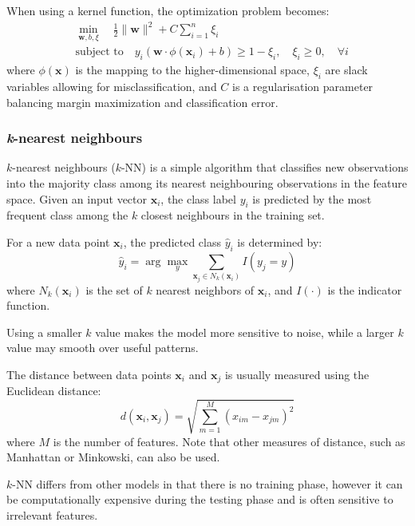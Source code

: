 When using a kernel function, the optimization problem becomes:
\begin{equation}
	\begin{aligned}
		& \min_{\mathbf{w}, b, \xi} \quad \frac{1}{2} \|\mathbf{w}\|^2 + C \sum_{i=1}^{n} \xi_i \\
		& \text{subject to} \quad y_i (\mathbf{w} \cdot \phi(\mathbf{x}_i) + b) \geq 1 - \xi_i, \quad \xi_i \geq 0, \quad \forall i
	\end{aligned}
\end{equation}
where \( \phi(\mathbf{x}) \) is the mapping to the higher-dimensional space, \( \xi_i \) are slack variables allowing for misclassification, and \( C \) is a regularisation parameter balancing margin maximization and classification error.

\subsubsection{\textit{k}-nearest neighbours}

$k$-nearest neighbours ($k$-NN) \cite{knn} is a simple algorithm that classifies new observations into the majority class among its nearest neighbouring observations in the feature space. Given an input vector \( \mathbf{x}_i \), the class label \( y_i \) is predicted by the most frequent class among the \( k \) closest neighbours in the training set.

For a new data point \( \mathbf{x}_i \), the predicted class \( \hat{y}_i \) is determined by:
\begin{equation}
	\hat{y}_i = \arg\max_{y} \sum_{\mathbf{x}_j \in N_k(\mathbf{x}_i)} I(y_j = y)
\end{equation}
where \( N_k(\mathbf{x}_i) \) is the set of \( k \) nearest neighbors of \( \mathbf{x}_i \), and \( I(\cdot) \) is the indicator function.

Using a smaller \( k \) value makes the model more sensitive to noise, while a larger \( k \) value may smooth over useful patterns.

The distance between data points \( \mathbf{x}_i \) and \( \mathbf{x}_j \) is usually measured using the Euclidean distance:
\begin{equation}
	d(\mathbf{x}_i, \mathbf{x}_j) = \sqrt{\sum_{m=1}^{M} (x_{im} - x_{jm})^2}
\end{equation}
where \( M \) is the number of features. Note that other measures of distance, such as Manhattan or Minkowski, can also be used.

$k$-NN differs from other models in that there is no training phase, however it can be computationally expensive during the testing phase and is often sensitive to irrelevant features.

